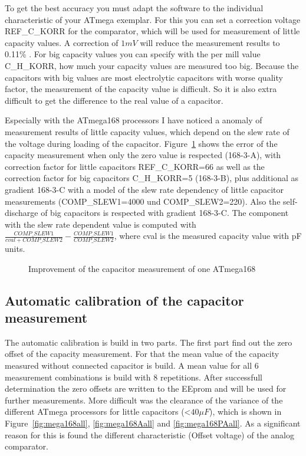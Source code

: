 To get the best accuracy you must adapt the software to the individual characteristic of your ATmega exemplar.
For this you can set a correction voltage REF\_C\_KORR for the comparator, which will be used for measurement of little capacity values.
A correction of \(1mV\) will reduce the measurement results to 0.11\% .
For big capacity values you can specify with the per mill value C\_H\_KORR, how much your capacity values are measured too big.
Because the capacitors with big values are most electrolytic capacitors with worse quality factor, the measurement of
the capacity value is difficult. So it is also extra difficult to get the difference to the real value of a capacitor.

Especially with the ATmega168 processors I have noticed a anomaly of measurement results of little capacity values,
which depend on the slew rate of the voltage during loading of the capacitor.
Figure~\ref{fig:mega168optcap} shows the error of the capacity measurement when only the zero value is respected
(168-3-A), with correction factor for little capacitors REF\_C\_KORR=66 as well as the correction factor for big
capacitors C\_H\_KORR=5 (168-3-B), plus additional as gradient 168-3-C  with a model of the slew rate dependency of little capacitor 
measurements (COMP\_SLEW1=4000 und COMP\_SLEW2=220). Also the self-discharge of big capacitors is respected with gradient 168-3-C.
The component with the slew rate dependent value is computed with \(\frac{COMP\_SLEW1}{cval+COMP\_SLEW2} - \frac{COMP\_SLEW1}{COMP\_SLEW2}\),
where cval is the measured capacity value with pF units.

\begin{figure}[H]
\centering

\caption{Improvement of the capacitor measurement of one ATmega168}
\label{fig:mega168optcap}
\end{figure}

\subsection{Automatic calibration of the capacitor measurement}

The automatic calibration is build in two parts. The first part find out the zero offset of the capacity measurement.
For that the mean value of the capacity measured without connected capacitor is build. 
A mean value for all 6 measurement combinations is build with 8 repetitions.
After successfull determination the zero offsets are written to the EEprom and will be used for further measurements.
More difficult was the clearance of the variance of the different ATmega processors for little capacitors (\textless \(40 \mu F\)),
which is shown in Figure~\ref{fig:mega168all}, \ref{fig:mega168Aall} and \ref{fig:mega168PAall}.
As a significant reason for this is found the different characteristic (Offset voltage) of the analog comparator.

